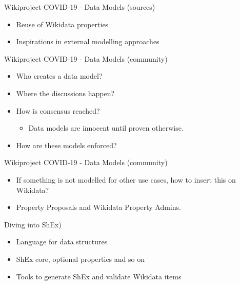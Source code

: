 \documentclass{beamer}
\begin{document}
\begin{frame}{Wikiproject COVID-19 - Data Models (sources)}
\begin{itemize}
    \item Reuse of Wikidata properties
    \item Inspirations in external modelling approaches
\end{itemize}
\end{frame}

\begin{frame}{Wikiproject COVID-19 - Data Models (community)}
\begin{itemize}
    \item Who creates a data model?
    \item Where the discussions happen?
    \item How is consensus reached?
    \begin{itemize}
        \item Data models are innocent until proven otherwise.
    \end{itemize}
    \item How are these models enforced?
\end{itemize}
\end{frame}

\begin{frame}{Wikiproject COVID-19 - Data Models (community)}
\begin{itemize}
    \item If something is not modelled for other use cases, how to insert this on Wikidata?
    \item Property Proposals and Wikidata Property Admins.
\end{itemize}
\end{frame}

\begin{frame}{Diving into ShEx)}
\begin{itemize}
    \item Language for data structures
    \item ShEx core, optional properties and so on
    \item Tools to generate ShEx and validate Wikidata items
\end{itemize}
\end{frame}


\begin{frame}
  \titlepage
\end{frame}
\end{document}
